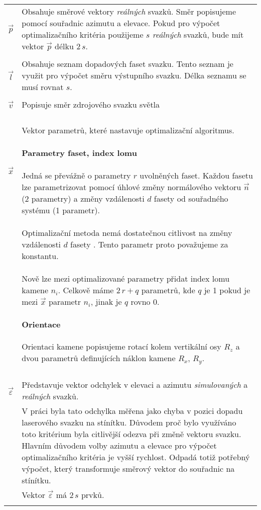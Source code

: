 \begin{tabular}{l p{12cm}}
$\vec{p}$ & Obsahuje směrové vektory \textit{reálných} svazků. Směr popisujeme pomocí souřadnic azimutu a elevace. Pokud pro výpočet optimalizačního kritéria použijeme $s$ \textit{reálných} svazků, bude mít vektor $\vec{p}$ délku $2\,s$. \\ & \\

$\vec{l}$ & Obsahuje seznam dopadových faset svazku. Tento seznam je využit pro výpočet směru výstupního svazku. Délka seznamu se musí rovnat $s$. \\ & \\

$\vec{v}$ & Popisuje směr zdrojového svazku světla\\ & \\  

$\vec{x}$ & Vektor parametrů, které nastavuje optimalizační algoritmus.
\paragraph{Parametry faset, index lomu}

 Jedná se převážně o parametry $r$ uvolněných faset. Každou fasetu lze parametrizovat pomocí úhlové změny normálového vektoru $\vec{n}$ (2 parametry) a změny vzdálenosti $d$ fasety od souřadného systému (1 parametr).\\
& Optimalizační metoda nemá dostatečnou citlivost na změny vzdálenosti $d$ fasety \cite{Bodlak2005}. Tento parametr proto považujeme za konstantu.\\
& Nově lze mezi optimalizované parametry přidat index lomu kamene $n_i$. Celkově máme $2\,r + q$ parametrů, kde $q$ je 1 pokud je mezi $\vec{x}$ parametr $n_i$, jinak je $q$ rovno 0.

\paragraph{Orientace} Orientaci kamene popisujeme rotací kolem vertikální osy $R_z$ a dvou parametrů definujících náklon kamene $R_x$, $R_y$. 
 \\ & \\

$\vec{\varepsilon}$ & Představuje vektor odchylek v elevaci a azimutu \textit{simulovaných} a \textit{reálných} svazků.\\ 
& V práci \cite{Bodlak2005} byla tato odchylka měřena jako chyba v pozici dopadu laserového svazku na stínítku. Důvodem proč bylo využíváno toto kritérium byla citlivější odezva při změně vektoru svazku. Hlavním důvodem volby azimutu a elevace pro výpočet optimalizačního kritéria je vyšší rychlost. Odpadá totiž potřebný výpočet, který transformuje směrový vektor do souřadnic na stínítku.\\ & Vektor $\vec{\varepsilon}$ má $2\,s$ prvků.\\ & \\

\end{tabular}

